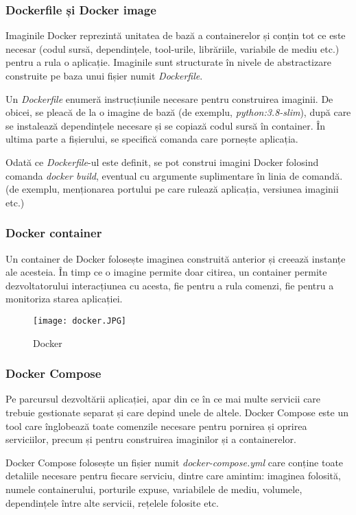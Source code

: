 \subsubsection{Dockerfile și Docker image}
\par
Imaginile Docker reprezintă unitatea de bază a containerelor și conțin tot ce este necesar (codul sursă,
dependințele, tool-urile, librăriile, variabile de mediu etc.) pentru a rula o aplicație. Imaginile
sunt structurate în nivele de abstractizare construite pe baza unui fișier numit \textit{Dockerfile}.
\par
Un \textit{Dockerfile} enumeră instrucțiunile necesare pentru construirea imaginii. De obicei, se pleacă
de la o imagine de bază (de exemplu, \textit{python:3.8-slim}), după care se instalează dependințele
necesare și se copiază codul sursă în container. În ultima parte a fișierului, se specifică comanda
care pornește aplicația.
\par
Odată ce \textit{Dockerfile}-ul este definit, se pot construi imagini Docker folosind comanda \textit{docker build},
eventual cu argumente suplimentare în linia de comandă. (de exemplu, menționarea portului pe care rulează aplicația, 
versiunea imaginii etc.)

\subsubsection{Docker container}
\par
Un container de Docker folosește imaginea construită anterior și creează instanțe ale acesteia. În timp ce
o imagine permite doar citirea, un container permite dezvoltatorului interacțiunea cu acesta, fie pentru
a rula comenzi, fie pentru a monitoriza starea aplicației.

\begin{figure}[h]
    \centering
    \texttt{[image: docker.JPG]}
    \caption{Docker\protect\footnotemark[4]}
    \label{fig:docker}
\end{figure}

\subsubsection{Docker Compose}
\par
Pe parcursul dezvoltării aplicației, apar din ce în ce mai multe servicii care trebuie gestionate separat
și care depind unele de altele. Docker Compose este un tool care înglobează toate comenzile necesare
pentru pornirea și oprirea serviciilor, precum și pentru construirea imaginilor și a containerelor.
\par
Docker Compose folosește un fișier numit \textit{docker-compose.yml} care conține toate detaliile necesare
pentru fiecare serviciu, dintre care amintim: imaginea folosită, numele containerului, porturile expuse,
variabilele de mediu, volumele, dependințele între alte servicii, rețelele folosite etc.

